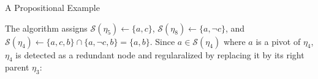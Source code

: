 \documentclass[final]{beamer} %
\begin{document}
\begin{frame}{}
\begin{columns}
\begin{column}{0.3\textwidth}
\begin{block}{A Propositional Example}



The algorithm {\RPI} assigns $\mathcal{S}(\eta_5) \leftarrow \{a,c\}$, $\mathcal{S}(\eta_8)\leftarrow \{a, \neg c\}$, and
$\mathcal{S}(\eta_4) \leftarrow \{a,c,b\}\cap \{ a,\lnot c, b\} =  \{a,b\}$.
Since $a\in \mathcal{S}(\eta_4)$ where $a$ is a pivot of $\eta_4$, $\eta_4$ is detected as a redundant node and regularalized by replacing it by its right parent $\eta_3$:


\end{block}
\end{column}
\end{columns}
\end{frame}
\end{document}

